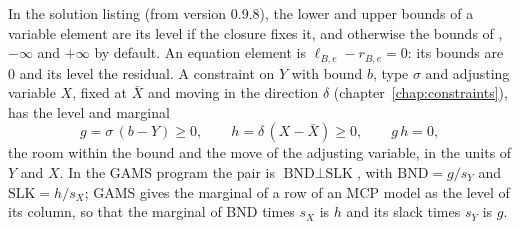 In the solution listing (from version 0.9.8), the lower and upper bounds of a
variable element are its level if the closure fixes it, and otherwise the
bounds of , $-\infty$ and $+\infty$ by default. An equation
element is $\ell_{B,e} - r_{B,e} = 0$: its bounds are 0 and its level the
residual. A constraint on $Y$ with bound $b$, type $\sigma$ and adjusting
variable $X$, fixed at $\bar X$ and moving in the direction $\delta$
(chapter~\ref{chap:constraints}), has the level and marginal
\begin{equation*}
g = \sigma\,(b - Y) \ge 0, \qquad h = \delta\,(X - \bar X) \ge 0, \qquad g\,h = 0,
\end{equation*}
the room within the bound and the move of the adjusting variable, in the
units of $Y$ and $X$. In the GAMS program the pair is $\text{BND} \perp \text{SLK}$,
with $\text{BND} = g / s_Y$ and $\text{SLK} = h / s_X$; GAMS gives the
marginal of a row of an MCP model as the level of its column, so that the
marginal of BND times $s_X$ is $h$ and its slack times $s_Y$ is $g$.


\begin{alsosee}
\end{alsosee}
